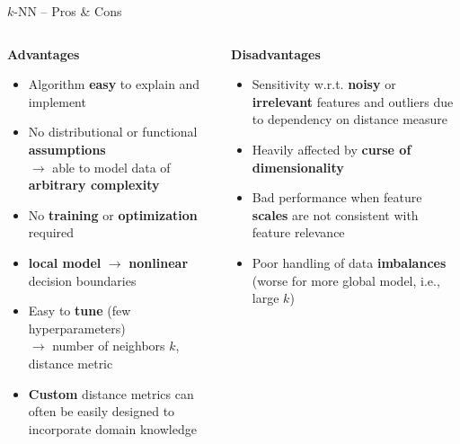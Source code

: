 \documentclass[11pt,compress,t,notes=noshow, xcolor=table]{beamer}
\newcommand{\highlight}[1]{\textcolor{hlcol}{\textbf{#1}}}
\newcommand{\positem}{\item[\textcolor{hlcol}{$\bm{+}$}]}
\newcommand{\negitem}{\item[\textcolor{hlcol}{$\bm{-}$}]}
\begin{document}
\begin{vbframe}{$k$-NN -- Pros \& Cons}
  \footnotesize

\begin{columns}[onlytextwidth]
  \begin{column}{0.5\textwidth}
    \highlight{Advantages}
    \footnotesize
    \begin{itemize}
      \positem Algorithm \textbf{easy} to explain and implement
      \positem No distributional or functional \textbf{assumptions}\\
      $\rightarrow$ able to model data of \textbf{arbitrary complexity} %
      \positem No \textbf{training} or \textbf{optimization} required 
      \positem \textbf{local model} $\rightarrow$ \textbf{nonlinear} decision boundaries
      \positem Easy to \textbf{tune} (few hyperparameters)\\
      $\rightarrow$ number of neighbors $k$, distance metric
      \positem \textbf{Custom} distance metrics can often be easily designed to incorporate domain knowledge
    \end{itemize}
  \end{column}
  \begin{column}{0.5\textwidth}
    \highlight{Disadvantages}
    \footnotesize
    \begin{itemize}
      \negitem Sensitivity w.r.t. \textbf{noisy} or \textbf{irrelevant} features and outliers due to dependency on distance measure
      \negitem Heavily affected by \textbf{curse of dimensionality}
      \negitem Bad performance when feature \textbf{scales} are not consistent with feature relevance
      \negitem Poor handling of data \textbf{imbalances} (worse for more global model, i.e., large $k$)
    \end{itemize}
  \end{column}
\end{columns}
  
\end{vbframe}
\end{document}
